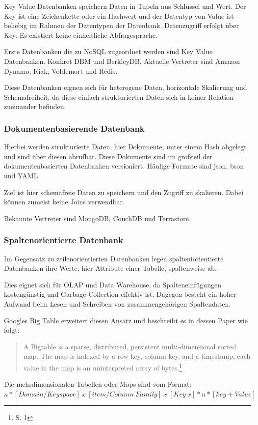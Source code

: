 Key Value Datenbanken speichern Daten in Tupeln aus Schlüssel und Wert.
Der Key ist eine Zeichenkette oder ein Hashwert und der Datentyp von Value ist beliebig im Rahmen der Datentypen der Datenbank.
Datenzugriff erfolgt über Key.
Es existiert keine einheitliche Abfragesprache.

Erste Datenbanken die zu NoSQL zugeordnet werden sind Key Value Datenbanken. Konkret DBM und BerkleyDB.
Aktuelle Vertreter sind Amazon Dynamo, Riak, Voldemort und Redis.

Diese Datenbanken eignen sich für heterogene Daten, horizontale Skalierung und Schemafreiheit, da diese einfach strukturierten Daten sich in keiner Relation zueinander befinden.

\subsubsection{Dokumentenbasierende Datenbank}

Hierbei werden strukturierte Daten, hier Dokumente, unter einem Hash abgelegt und sind über diesen abrufbar.
Diese Dokumente sind im großteil der dokumentenbasierten Datenbanken versioniert.
Häufige Formate sind \Gls{json}, \Gls{bson} und YAML.

Ziel ist hier schemafreie Daten zu speichern und den Zugriff zu skalieren.
Dabei können zumeist keine Joins verwendbar.

Bekannte Vertreter sind MongoDB, CouchDB und Terrastore.

\subsubsection{Spaltenorientierte Datenbank}

Im Gegensatz zu zeilenorientierten Datenbanken legen spalteniorientierte Datenbanken ihre Werte, hier Attribute einer Tabelle, spaltenweise ab.

Dies eignet sich für OLAP und Data Warehouse, da Spalteneinfügungen kostengünstig und Garbage Collection effektiv ist.
Dagegen besteht ein hoher Aufwand beim Lesen und Schreiben von zusammengehörigen Spaltendaten.

Googles Big Table erweitert diesen Ansatz und beschreibt es in dessen Paper wie folgt:
\begin{quote}
A  Bigtable  is  a  sparse,  distributed,  persistent  multi-dimensional sorted map. The map is indexed by a row key, column key, and a timestamp; each value in the map is an uninterpreted array of bytes.\footnote{\cite{paper:bigtable} S. 1}
\end{quote}
Die mehrdimensionalen Tabellen oder Maps sind vom Format:\\
$n*[Domain / Keyspace]\ x\ [item / Column\ Family]\ x\ [Key\ x]*n*[key+Value]$

